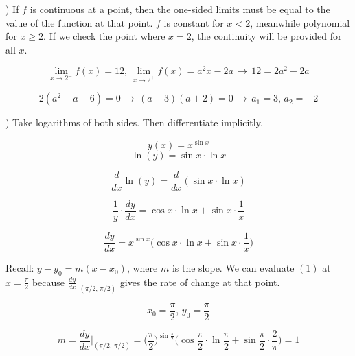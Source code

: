 \documentclass{article}
\begin{document}
\hfill

) If $f$ is continuous at a point, then the one-sided limits must be equal to the value of the function at that point. $f$ is constant for $x < 2$, meanwhile polynomial for $x \geq 2$. If we check the point where $x=2$, the continuity will be provided for all $x$.

\begin{equation*}\lim_{x \to 2^-} f(x) = 12,\, \lim_{x \to 2^+} f(x) = a^2x-2a \,\rightarrow\, 12 = 2a^2-2a \end{equation*}

\begin{equation*} 2(a^2-a - 6) = 0\,\rightarrow\,(a-3)(a+2) = 0\,\rightarrow\,\boxed{a_1 = 3,\,a_2 = -2}\end{equation*}

\hfill

) Take logarithms of both sides. Then differentiate implicitly.

\begin{equation*}y(x) = x^{\sin x}\end{equation*}
\begin{equation*}\ln(y) = \sin x \cdot \ln x\end{equation*}

\begin{equation*}\frac{d}{dx}\ln(y) = \frac{d}{dx}(\sin x \cdot \ln x)\end{equation*}

\begin{equation*} \frac{1}{y} \cdot \frac{dy}{dx} =  \cos x \cdot \ln x +  \sin x \cdot \frac{1}{x}\end{equation*}

\begin{equation} \frac{dy}{dx} = x^{\sin x}\Big(\cos x \cdot \ln x +  \sin x \cdot \frac{1}{x}\Big)\end{equation}

\hfill

\noindent Recall: $y-y_0 = m(x-x_0)$, where $m$ is the slope. We can evaluate $(1)$ at $x = \frac{\pi}{2}$ because $\frac{dy}{dx}|_{(\pi/2,\, \pi/2)}$ gives the rate of change at that point.

\[x_0 = \frac{\pi}{2},\,y_0 = \frac{\pi}{2}\]

\[m = \frac{dy}{dx}\Bigg|_{(\pi/2,\, \pi/2)} = \Big(\frac{\pi}{2}\Big)^{\sin \frac{\pi}{2}}\Big(\cos\frac{\pi}{2} \cdot \ln \frac{\pi}{2} + \sin \frac{\pi}{2} \cdot \frac{2}{\pi}\Big) = 1\]
\end{document}
